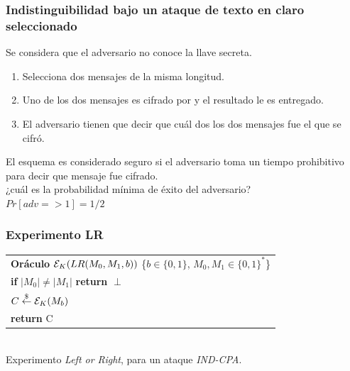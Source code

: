 \documentclass{beamer}
\newcommand{\rand}{\stackrel{\$}\leftarrow}
\newcommand{\binStr}{\{0,1\}}
\newcommand{\tab}{\hspace{0.5cm}}
\begin{document}
\frame
{
	\frametitle{Indistinguibilidad bajo un ataque de texto en claro seleccionado}

	Se considera que el adversario no conoce la llave secreta.

	\begin{enumerate}
	\item Selecciona dos mensajes de la misma longitud.
	\item Uno de los dos mensajes es cifrado por y el resultado le es entregado.
	\item El adversario tienen que decir que cuál dos los dos mensajes fue el que se cifró. 
	\end{enumerate}
\pause
{\color{red}El esquema es considerado seguro si el adversario toma un tiempo prohibitivo para decir que mensaje fue cifrado.}\\
\vspace{0.5cm}
{\color{red} {¿cuál es la probabilidad mínima de éxito del adversario?}}\\
\pause
\vspace{0.5cm}
{\color{blue}$Pr[adv=>1]=1/2$}
}


\frame
{
	\frametitle{Experimento LR}

	 \begin{tabular}{l}
	 \textbf{Oráculo} ${\cal E}_K(LR(M_0,M_1,b))$ {\color{green}\{$b\in\{0,1\}$, $M_0,M_1\in \binStr^*$\}}  \\
	 \tab\textbf{if} $|M_0|\neq |M_1|$ \textbf{return} $\perp$ \\
	 \tab\tab $C\rand {\cal E}_K(M_b)$\\
	 \tab\tab \textbf{return} C
	 \end{tabular}\\
\vspace{0.5cm}
{\color{red}Experimento \textit{Left or Right}, para un ataque \textit{IND-CPA}.}
}
\end{document}

